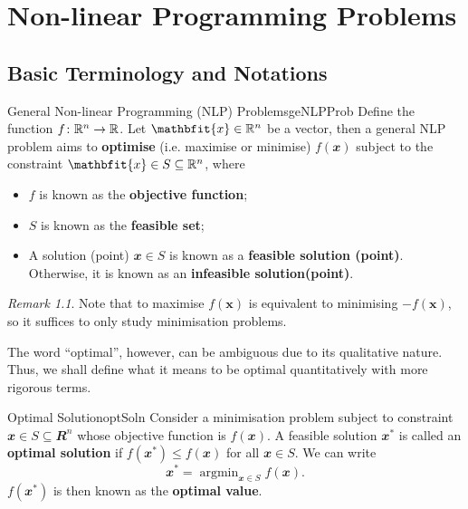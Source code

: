 \documentclass[math, code]{amznotes}
\theoremstyle{remark}
\newtheorem*{remark}{Remark}
\DeclareMathOperator*{\argmin}{argmin}
\begin{document}
\tableofcontents

\chapter{Non-linear Programming Problems}
\section{Basic Terminology and Notations}
\begin{dfnbox}{General Non-linear Programming (NLP) Problems}{geNLPProb}
    Define the function $f \colon \mathbb{R}^n \to \mathbb{R}$. Let $\mathbfit{x} \in \R^n$ be a vector, then a general NLP problem aims to {\color{red} \textbf{optimise}} (i.e. maximise or minimise) $f(\mathbfit{x})$ subject to the constraint $\mathbfit{x} \in S \subseteq \R^n$, where
    \begin{itemize}
        \item $f$ is known as the {\color{red} \textbf{objective function}};
        \item $S$ is known as the {\color{red} \textbf{feasible set}};
        \item A solution (point) $\mathbfit{x} \in S$ is known as a {\color{red} \textbf{feasible solution (point)}}. Otherwise, it is known as an {\color{red} \textbf{infeasible solution(point)}}. 
    \end{itemize}
\end{dfnbox}
\begin{notebox}
    \begin{remark}
        Note that to maximise $f(\mathbf{x})$ is equivalent to minimising $-f(\mathbf{x})$, so it suffices to only study minimisation problems.
    \end{remark}
\end{notebox}
The word ``optimal'', however, can be ambiguous due to its qualitative nature. Thus, we shall define what it means to be optimal quantitatively with more rigorous terms.
\begin{dfnbox}{Optimal Solution}{optSoln}
    Consider a minimisation problem subject to constraint $\mathbfit{x} \in S \subseteq \mathbfit{R}^n$ whose objective function is $f(\mathbfit{x})$. A feasible solution $\mathbfit{x}^*$ is called an {\color{red} \textbf{optimal solution}} if $f(\mathbfit{x}^*) \leq f(\mathbfit{x})$ for all $\mathbfit{x} \in S$. We can write
    \begin{equation*}
        \mathbfit{x}^* = \argmin_{\mathbfit{x} \in S} f(\mathbfit{x}).
    \end{equation*}
    $f(\mathbfit{x}^*)$ is then known as the {\color{red} \textbf{optimal value}}.
\end{dfnbox}
\end{document}
